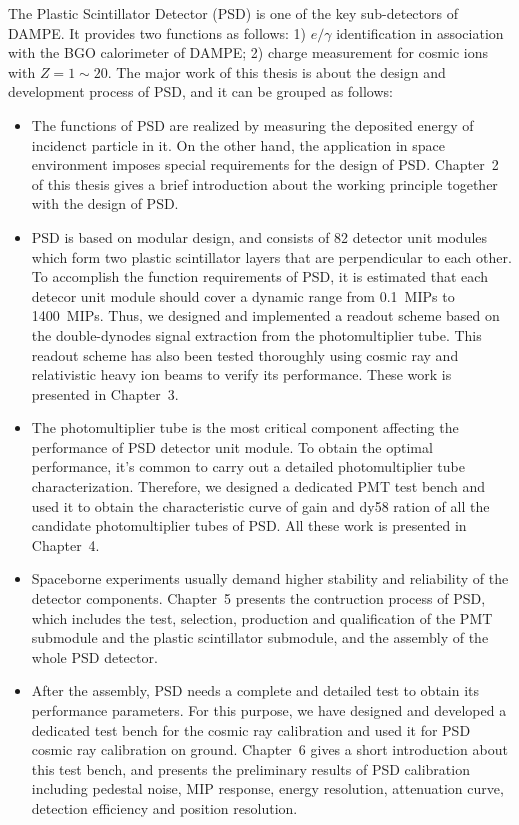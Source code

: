 \begin{eabstract}
The Plastic Scintillator Detector (PSD) is one of the key sub-detectors of DAMPE.
It provides two functions as follows: 1) $e/\gamma$ identification in association with the BGO calorimeter of DAMPE; 2) charge measurement for cosmic ions with $Z=1\sim 20$.
The major work of this thesis is about the design and development process of PSD, and it can be grouped as follows:
\begin{itemize}
  \item The functions of PSD are realized by measuring the deposited energy of incidenct particle in it. On the other hand, the application in space environment imposes special requirements for the design of PSD. Chapter~2 of this thesis gives a brief introduction about the working principle together with the design of PSD.
  \item PSD is based on modular design, and consists of 82 detector unit modules which form two plastic scintillator layers that are perpendicular to each other. To accomplish the function requirements of PSD, it is estimated that each detecor unit module should cover a dynamic range from \SI{0.1}{MIPs} to \SI{1400}{MIPs}. Thus, we designed and implemented a readout scheme based on the double-dynodes signal extraction from the photomultiplier tube. This readout scheme has also been tested thoroughly using cosmic ray and relativistic heavy ion beams to verify its performance. These work is presented in Chapter~3.
  \item The photomultiplier tube is the most critical component affecting the performance of PSD detector unit module. To obtain the optimal performance, it's common to carry out a detailed photomultiplier tube characterization. Therefore, we designed a dedicated PMT test bench and used it to obtain the characteristic curve of gain and dy58 ration of all the candidate photomultiplier tubes of PSD. All these work is presented in Chapter~4.
  \item Spaceborne experiments usually demand higher stability and reliability of the detector components. Chapter~5 presents the contruction process of PSD, which includes the test, selection, production and qualification of the PMT submodule and the plastic scintillator submodule, and the assembly of the whole PSD detector.
  \item After the assembly, PSD needs a complete and detailed test to obtain its performance parameters. For this purpose, we have designed and developed a dedicated test bench for the cosmic ray calibration and used it for PSD cosmic ray calibration on ground. Chapter~6 gives a short introduction about this test bench, and presents the preliminary results of PSD calibration including pedestal noise, MIP response, energy resolution, attenuation curve, detection efficiency and position resolution.
\end{itemize}
\end{eabstract}

